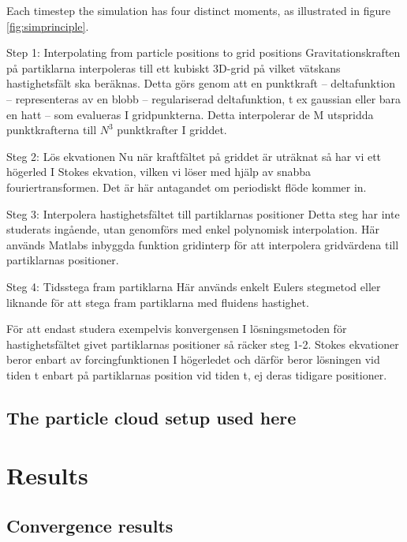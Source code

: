 \documentclass[a4paper,twoside=false,abstract=false,numbers=noenddot,
titlepage=false,headings=small,parskip=half,version=last]{scrartcl}
\begin{document}
Each timestep the simulation has four distinct moments, as illustrated in figure \ref{fig:simprinciple}.

Step 1: Interpolating from particle positions to grid positions
Gravitationskraften på partiklarna interpoleras till ett kubiskt 3D-grid på vilket vätskans hastighetsfält ska beräknas. Detta görs genom att en punktkraft – deltafunktion – representeras av en	 blobb – regulariserad deltafunktion, t ex gaussian eller bara en hatt – som evalueras I gridpunkterna. Detta interpolerar de M utspridda punktkrafterna till $N^3$ punktkrafter I griddet.

Steg 2: Lös ekvationen
Nu när kraftfältet på griddet är uträknat så har vi ett högerled I Stokes ekvation, vilken vi löser med hjälp av snabba fouriertransformen. Det är här antagandet om periodiskt flöde kommer in.

Steg 3: Interpolera hastighetsfältet till partiklarnas positioner
Detta steg har inte studerats ingående, utan genomförs med enkel polynomisk interpolation. Här används Matlabs inbyggda funktion gridinterp för att interpolera gridvärdena till partiklarnas positioner.

Steg 4: Tidsstega fram partiklarna
Här används enkelt Eulers stegmetod eller liknande för att stega fram partiklarna med fluidens hastighet.

För att endast studera exempelvis konvergensen I lösningsmetoden för hastighetsfältet givet partiklarnas positioner så räcker steg 1-2. Stokes ekvationer beror enbart av forcingfunktionen I högerledet och därför beror lösningen vid tiden t enbart på partiklarnas position vid tiden t, ej deras tidigare positioner.

\subsection{The particle cloud setup used here}

\section{Results}

\subsection{Convergence results}
\end{document}
